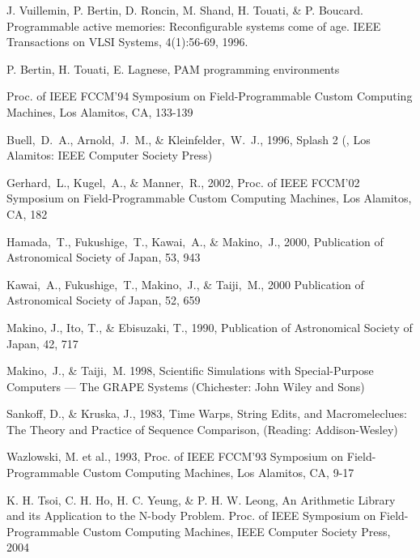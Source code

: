 \documentclass[times, 10pt,twocolumn]{article}
\begin{document}

\begin{thebibliography}{}

J. Vuillemin, P. Bertin, D. Roncin, M. Shand, H. Touati, \& P. Boucard.
Programmable active memories: Reconfigurable systems come of age.
IEEE Transactions on VLSI Systems, 4(1):56-69, 1996.

P. Bertin, H. Touati, E. Lagnese,
PAM programming environments


Proc. of IEEE FCCM'94 Symposium on Field-Programmable Custom Computing Machines, Los Alamitos, CA, 133-139

Buell,~D.~A., Arnold,~J.~M., \& Kleinfelder,~W.~J.,
1996, Splash 2 (, Los Alamitos: IEEE Computer Society Press)

Gerhard,~L., Kugel,~A., \& Manner,~R., 2002,
Proc. of IEEE FCCM'02 Symposium on Field-Programmable Custom Computing Machines, Los Alamitos, CA, 182

Hamada,~T., Fukushige,~T., Kawai,~A., \& Makino,~J., 2000, 
Publication of Astronomical Society of Japan, 53, 943

Kawai,~A., Fukushige,~T., Makino,~J., \& Taiji,~M., 2000
Publication of Astronomical Society of Japan, 52, 659

Makino, J., Ito, T., \& Ebisuzaki, T., 1990, 
Publication of Astronomical Society of Japan, 42, 717

Makino,~J., \& Taiji,~M. 1998, Scientific Simulations
with Special-Purpose Computers --- The GRAPE Systems (Chichester: John Wiley and Sons)


Sankoff, D., \& Kruska, J., 1983, Time Warps, String Edits, and Macromeleclues:
The Theory and Practice of Sequence Comparison, (Reading: Addison-Wesley)

Wazlowski, M. et al., 1993,
Proc. of IEEE FCCM'93 Symposium on Field-Programmable Custom Computing Machines, Los Alamitos, CA, 9-17


K. H. Tsoi, C. H. Ho, H. C. Yeung, \& P. H. W. Leong,
An Arithmetic Library and its Application to the N-body Problem.
Proc. of IEEE Symposium on Field-Programmable Custom Computing Machines, 
IEEE Computer Society Press, 2004




\end{thebibliography}
\end{document}
